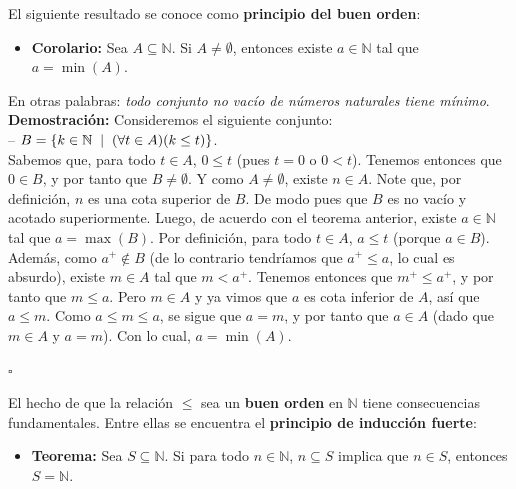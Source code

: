\documentclass[10 pt]{article}
\begin{document}
\Large{El siguiente resultado se conoce como \textbf{principio del buen orden}:} \\

\begin{itemize}
    \item \Large{\textbf{Corolario:} Sea $A \subseteq \mathbb N$. Si $A \neq \emptyset$, entonces existe $a \in \mathbb N$ tal que $a=\min(A)$.} \\
\end{itemize}

\Large{En otras palabras: \textit{todo conjunto no vacío de números naturales tiene mínimo}.} \\

\Large{\textbf{Demostración:} Consideremos el siguiente conjunto: \\

-- $B=\{k \in \mathbb N \hspace{0.2 cm}|\hspace{0.2 cm} (\forall t \in A)(k \leq t) \}$. \\

Sabemos que, para todo $t \in A$, $0 \leq t$ (pues $t=0$ o $0<t$). Tenemos entonces que $0 \in B$, y por tanto que $B \neq \emptyset$. Y como $A \neq \emptyset$, existe $n \in A$. Note que, por definición, $n$ es una cota superior de $B$. De modo pues que $B$ es no vacío y acotado superiormente. Luego, de acuerdo con el teorema anterior, existe $a \in \mathbb N$ tal que $a=\max(B)$. Por definición, para todo $t \in A$, $a \leq t$ (porque $a \in B$). Además, como $a^+ \notin B$ (de lo contrario tendríamos que $a^+ \leq a$, lo cual es absurdo), existe $m \in A$ tal que $m<a^+$. Tenemos entonces que $m^+ \leq a^+$, y por tanto que $m \leq a$. Pero $m \in A$ y ya vimos que $a$ es cota inferior de $A$, así que $a \leq m$. Como $a \leq m \leq a$, se sigue que $a=m$, y por tanto que $a \in A$ (dado que $m \in A$ y $a=m$). Con lo cual, $a=\min(A)$.} \\ 

\begin{flushright}
    $\square$
\end{flushright}

\Large{El hecho de que la relación $\leq$ sea un \textbf{buen orden} en $\mathbb N$ tiene consecuencias fundamentales. Entre ellas se encuentra el \textbf{principio de inducción fuerte}:} \\

\begin{itemize}
    \item \Large{\textbf{Teorema:} Sea $S \subseteq \mathbb N$. Si para todo $n \in \mathbb N$, $n \subseteq S$ implica que $n \in S$, entonces $S=\mathbb N$.} \\
\end{itemize}
\end{document}
